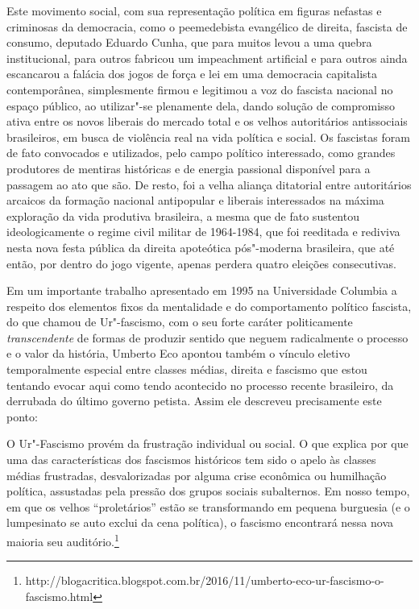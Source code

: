 Este movimento social, com sua representação política em figuras
nefastas e criminosas da democracia, como o peemedebista evangélico de
direita, fascista de consumo, deputado Eduardo Cunha, que para muitos
levou a uma quebra institucional, para outros fabricou um impeachment
artificial e para outros ainda escancarou a falácia dos jogos de força e
lei em uma democracia capitalista contemporânea, simplesmente firmou e
legitimou a voz do fascista nacional no espaço público, ao utilizar"-se
plenamente dela, dando solução de compromisso ativa entre os novos
liberais do mercado total e os velhos autoritários antissociais
brasileiros, em busca de violência real na vida política e social. Os
fascistas foram de fato convocados e utilizados, pelo campo político
interessado, como grandes produtores de mentiras históricas e de energia
passional disponível para a passagem ao ato que são. De resto, foi a
velha aliança ditatorial entre autoritários arcaicos da formação
nacional antipopular e liberais interessados na máxima exploração da
vida produtiva brasileira, a mesma que de fato sustentou ideologicamente
o regime civil militar de 1964-1984, que foi reeditada e rediviva nesta
nova festa pública da direita apoteótica pós"-moderna brasileira, que até
então, por dentro do jogo vigente, apenas perdera quatro eleições
consecutivas.

Em um importante trabalho apresentado em 1995 na Universidade Columbia a
respeito dos elementos fixos da mentalidade e do comportamento político
fascista, do que chamou de Ur"-fascismo, com o seu forte caráter
politicamente \emph{transcendente} de formas de produzir sentido que
neguem radicalmente o processo e o valor da história, Umberto Eco
apontou também o vínculo eletivo temporalmente especial entre classes
médias, direita e fascismo que estou tentando evocar aqui como tendo
acontecido no processo recente brasileiro, da derrubada do último
governo petista. Assim ele descreveu precisamente este ponto:

O Ur"-Fascismo provém da frustração individual ou social. O que explica
por que uma das características dos fascismos históricos tem sido o
apelo às classes médias frustradas, desvalorizadas por alguma crise
econômica ou humilhação política, assustadas pela pressão dos grupos
sociais subalternos. Em nosso tempo, em que os velhos ``proletários''
estão se transformando em pequena burguesia (e o lumpesinato se auto
exclui da cena política), o fascismo encontrará nessa nova maioria seu
auditório.\footnote{http://blogacritica.blogspot.com.br/2016/11/umberto-eco-ur-fascismo-o-fascismo.html}

